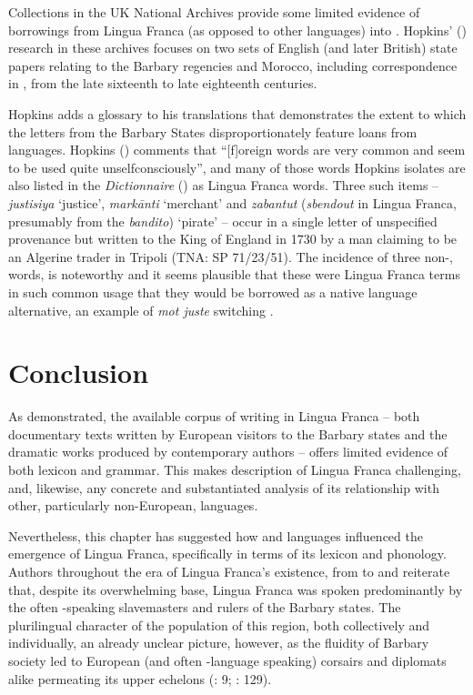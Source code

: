 \documentclass[output=paper]{langsci/langscibook}
\begin{document}
	Collections in the UK National Archives provide some limited evidence of borrowings from Lingua Franca (as opposed to other  languages) into . Hopkins' (\citeyear{Hopkins1982}) research in these archives focuses on two sets of English (and later British) state papers relating to the Barbary regencies and Morocco, including correspondence in , from the late sixteenth to late eighteenth centuries. 
	
	Hopkins adds a glossary to his translations that demonstrates the extent to which the  letters from the Barbary States disproportionately feature loans from  languages. Hopkins (\citeyear[x]{Hopkins1982}) comments that “[f]oreign words are very common and seem to be used quite unselfconsciously”, and many of those words Hopkins isolates are also listed in the \textit{Dictionnaire} (\citeyear{Anonymous1830}) as Lingua Franca words. Three such items -- \textit{justisiya} ‘justice’, \textit{markānti} ‘merchant’ and \textit{zabantut} (\textit{sbendout} in Lingua Franca, presumably from the  \textit{bandito}) ‘pirate’ -- occur in a single letter of unspecified provenance but written to the King of England in 1730 by a man claiming to be an Algerine trader in Tripoli (TNA: SP 71/23/51). The incidence of three non-,  words, is noteworthy and it seems plausible that these were Lingua Franca terms in such common usage that they would be borrowed as a native language alternative, an example of \textit{mot juste} switching \citep[32]{Gardner-Chloros2009}.
	
\section{Conclusion}
	
	As demonstrated, the available corpus of writing in Lingua Franca – both documentary texts written by European visitors to the Barbary states and the dramatic works produced by contemporary authors – offers limited evidence of both lexicon and grammar. This makes description of Lingua Franca challenging, and, likewise, any concrete and substantiated analysis of its relationship with other, particularly non-European, languages.
	
	Nevertheless, this chapter has suggested how  and  languages influenced the emergence of Lingua Franca, specifically in terms of its lexicon and phonology. Authors throughout the era of Lingua Franca’s existence, from \citet{Haedo1612} to \citet{Broughton1839} and \citet{Frank1850} reiterate that, despite its overwhelming  base, Lingua Franca was spoken predominantly by the often -speaking slavemasters and rulers of the Barbary states. The plurilingual character of the population of this region, both collectively and individually,  an already unclear picture, however, as the fluidity of Barbary society led to European (and often -language speaking) corsairs and diplomats alike permeating its upper echelons (\citealt{Haedo1612}: 9; \citealt{Garcès2011}: 129).
	
\end{document}
